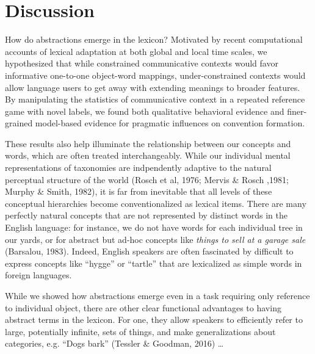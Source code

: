 \documentclass[10pt,letterpaper]{article}
\begin{document}
\section{Discussion}

How do abstractions emerge in the lexicon? Motivated by recent computational accounts of lexical adaptation at both global and local time scales, we hypothesized that while constrained communicative contexts would favor informative one-to-one object-word mappings, under-constrained contexts would allow language users to get away with extending meanings to broader features. By manipulating the statistics of communicative context in a repeated reference game with novel labels, we found both qualitative behavioral evidence and finer-grained model-based evidence for pragmatic influences on convention formation.

These results also help illuminate the relationship between our concepts and words, which are often treated interchangeably. While our individual mental representations of taxonomies are indpendently adaptive to the natural perceptual structure of the world (Rosch et al, 1976; Mervis \& Rosch ,1981; Murphy \& Smith, 1982), it is far from inevitable that all levels of these conceptual hierarchies become conventionalized as lexical items. There are many perfectly natural concepts that are not represented by distinct words in the English language: for instance, we do not have words for each individual tree in our yards, or for abstract but ad-hoc concepts like \emph{things to sell at a garage sale} (Barsalou, 1983). Indeed, English speakers are often fascinated by difficult to express concepts like ``hygge'' or ``tartle'' that are lexicalized as simple words in foreign languages.

While we showed how abstractions emerge even in a task requiring only reference to individual object, there are other clear functional advantages to having abstract terms in the lexicon. For one, they allow speakers to efficiently refer to large, potentially infinite, sets of things, and make generalizations about categories, e.g. ``Dogs bark'' (Tessler \& Goodman, 2016) \dots

\end{document}
